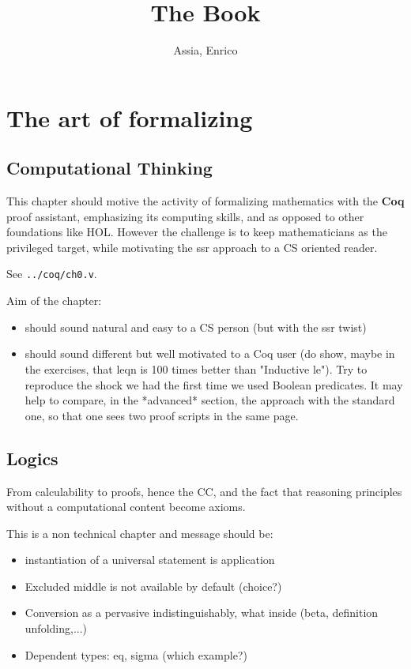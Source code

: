 \documentclass{book}
\title{The Book}
\author{Assia, Enrico}
\begin{document}
\maketitle
\tableofcontents{}

\part{The art of formalizing}

\chapter*{Computational Thinking}\label{ch:compthink}

This chapter should motive the activity of formalizing mathematics
with the {\bf Coq} proof assistant, emphasizing its computing skills,
and as opposed to other foundations like HOL. However the challenge is
to keep mathematicians as the privileged target, while motivating the
ssr approach to a CS oriented reader.

See \verb+../coq/ch0.v+.

Aim of the chapter:
\begin{itemize}
\item should sound natural and easy to a CS person (but with the ssr twist)
\item should sound different but well motivated to a Coq user (do show, maybe in
  the exercises, that leqn is 100 times better than "Inductive le").  Try to
  reproduce the shock we had the first time we used Boolean predicates.  It may
  help to compare, in the *advanced* section, the approach with the standard
  one, so that one sees two proof scripts in the same page.
\end{itemize}

\chapter{Logics}

From calculability to proofs, hence the CC, and the fact that
reasoning principles without a computational content become axioms.

This is a non technical chapter and message should be:
\begin{itemize}
\item instantiation of a universal statement is application
\item Excluded middle is not available by default (choice?)
\item Conversion as a pervasive indistinguishably, what inside
  (beta, definition unfolding,...)
\item Dependent types: eq, sigma (which example?)
\end{itemize}
\end{document}
